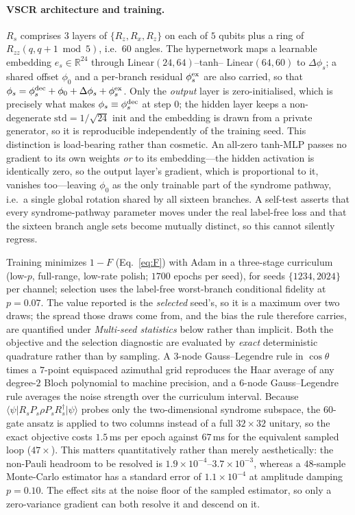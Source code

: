 \documentclass[aps,prxquantum,reprint,superscriptaddress]{revtex4-2}
\newcommand{\ket}[1]{\lvert #1\rangle}
\newcommand{\bra}[1]{\langle #1\rvert}
\begin{document}
\paragraph{VSCR architecture and training.}
$R_s$ comprises $3$ layers of $\{R_z,R_x,R_z\}$ on each of $5$ qubits plus a
ring of $R_{zz}(q,q{+}1\bmod 5)$, i.e.\ $60$ angles. The hypernetwork maps a
learnable embedding $e_s\in\mathbb{R}^{24}$ through Linear$(24,64)$--tanh--
Linear$(64,60)$ to $\Delta\phi_s$; a shared offset $\phi_0$ and a per-branch
residual $\phi^{\rm ex}_s$ are also carried, so that
$\phi_s=\phi^{\rm dec}_s+\phi_0+\Delta\phi_s+\phi^{\rm ex}_s$. Only the
\emph{output} layer is zero-initialised, which is precisely what makes
$\phi_s\equiv\phi^{\rm dec}_s$ at step $0$; the hidden layer keeps a
non-degenerate $\mathrm{std}=1/\sqrt{24}$ init and the embedding is drawn from a
private generator, so it is reproducible independently of the training seed.
This distinction is load-bearing rather than cosmetic. An all-zero tanh-MLP
passes no gradient to its own weights \emph{or} to its embedding---the hidden
activation is identically zero, so the output layer's gradient, which is
proportional to it, vanishes too---leaving $\phi_0$ as the only trainable part of
the syndrome pathway, i.e.\ a single global rotation shared by all sixteen
branches. A self-test asserts that every syndrome-pathway parameter moves under
the real label-free loss and that the sixteen branch angle sets become mutually
distinct, so this cannot silently regress.

Training minimizes $1-F$ (Eq.~\ref{eq:F}) with Adam in a three-stage curriculum
(low-$p$, full-range, low-rate polish; $1700$ epochs per seed), for seeds
$\{1234,2024\}$ per channel; selection uses the label-free worst-branch
conditional fidelity at $p=0.07$. The value reported is the \emph{selected}
seed's, so it is a maximum over two draws; the spread those draws come from, and
the bias the rule therefore carries, are quantified under \emph{Multi-seed
statistics} below rather than implicit. Both the objective and the selection
diagnostic are evaluated by \emph{exact} deterministic quadrature rather than by
sampling. A $3$-node Gauss--Legendre rule in $\cos\theta$ times a $7$-point
equispaced azimuthal grid reproduces the Haar average of any degree-$2$ Bloch
polynomial to machine precision, and a $6$-node Gauss--Legendre rule averages the
noise strength over the curriculum interval. Because
$\bra{\psi}R_sP_s\rho P_sR_s^\dagger\ket{\psi}$ probes only the two-dimensional
syndrome subspace, the $60$-gate ansatz is applied to two columns instead of a
full $32\times32$ unitary, so the exact objective costs $1.5$\,ms per epoch
against $67$\,ms for the equivalent sampled loop ($47\times$). This matters
quantitatively rather than merely aesthetically: the non-Pauli headroom to be
resolved is $1.9\times10^{-4}$--$3.7\times10^{-3}$, whereas a $48$-sample
Monte-Carlo estimator has a standard error of $1.1\times10^{-4}$ at amplitude
damping $p=0.10$. The effect sits at the noise floor of the sampled estimator, so
only a zero-variance gradient can both resolve it and descend on it.
\end{document}
